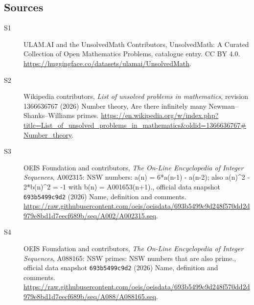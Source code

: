\documentclass[11pt]{article}
\begin{document}
\subsection{Sources}
\begin{description}
\item[\hypertarget{source:statement:1}{S1}] ULAM.AI and the UnsolvedMath Contributors, UnsolvedMath: A Curated Collection of Open Mathematics Problems, catalogue entry. CC BY 4.0. \url{https://huggingface.co/datasets/ulamai/UnsolvedMath}.
\item[\hypertarget{source:statement:2}{S2}] Wikipedia contributors, \emph{List of unsolved problems in mathematics}, revision 1366636767 (2026) Number theory, Are there infinitely many Newman–Shanks–Williams primes. \url{https://en.wikipedia.org/w/index.php?title=List_of_unsolved_problems_in_mathematics&oldid=1366636767#Number_theory}.
\item[\hypertarget{source:statement:3}{S3}] OEIS Foundation and contributors, \emph{The On-Line Encyclopedia of Integer Sequences}, A002315: NSW numbers: a(n) = 6*a(n-1) - a(n-2); also a(n)\textasciicircum{}2 - 2*b(n)\textasciicircum{}2 = -1 with b(n) = A001653(n+1)., official data snapshot \texttt{693b5499c9d2} (2026) Name, definition and comments. \url{https://raw.githubusercontent.com/oeis/oeisdata/693b5499c9d248f570dd2d979e8bd1d7eecf689b/seq/A002/A002315.seq}.
\item[\hypertarget{source:statement:4}{S4}] OEIS Foundation and contributors, \emph{The On-Line Encyclopedia of Integer Sequences}, A088165: NSW primes: NSW numbers that are also prime., official data snapshot \texttt{693b5499c9d2} (2026) Name, definition and comments. \url{https://raw.githubusercontent.com/oeis/oeisdata/693b5499c9d248f570dd2d979e8bd1d7eecf689b/seq/A088/A088165.seq}.
\end{description}
\label{end:statement}
\end{document}
